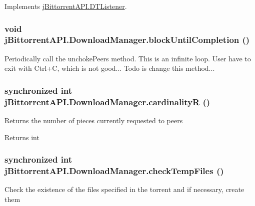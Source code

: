 Implements \hyperlink{interfacej_bittorrent_a_p_i_1_1_d_t_listener}{jBittorrentAPI.DTListener}.\hypertarget{classj_bittorrent_a_p_i_1_1_download_manager_aa52ddecb362a7f462dafc8b9181bf61e}{
\subsubsection[{blockUntilCompletion}]{\setlength{\rightskip}{0pt plus 5cm}void jBittorrentAPI.DownloadManager.blockUntilCompletion ()}}
\label{classj_bittorrent_a_p_i_1_1_download_manager_aa52ddecb362a7f462dafc8b9181bf61e}
Periodically call the unchokePeers method. This is an infinite loop. User have to exit with Ctrl+C, which is not good... Todo is change this method... \hypertarget{classj_bittorrent_a_p_i_1_1_download_manager_a08e44d470aa35a70f47c569e4b65b84b}{
\subsubsection[{cardinalityR}]{\setlength{\rightskip}{0pt plus 5cm}synchronized int jBittorrentAPI.DownloadManager.cardinalityR ()}}
\label{classj_bittorrent_a_p_i_1_1_download_manager_a08e44d470aa35a70f47c569e4b65b84b}
Returns the number of pieces currently requested to peers \begin{DoxyReturn}{Returns}
int 
\end{DoxyReturn}
\hypertarget{classj_bittorrent_a_p_i_1_1_download_manager_a8eb7c238409f2d32b62aef6a7a02bbcb}{
\subsubsection[{checkTempFiles}]{\setlength{\rightskip}{0pt plus 5cm}synchronized int jBittorrentAPI.DownloadManager.checkTempFiles ()}}
\label{classj_bittorrent_a_p_i_1_1_download_manager_a8eb7c238409f2d32b62aef6a7a02bbcb}
Check the existence of the files specified in the torrent and if necessary, create them

